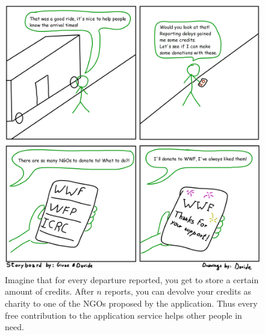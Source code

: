 \documentclass[a4paper, 11pt]{report}
\begin{document}
\begin{figure}[H]
	\centering
	\includegraphics [width=.5\textwidth]{img/storyboards/storyboard_donations.png}%
	\caption{Imagine that for every departure reported, you get to store a certain amount of credits.
		After $n$ reports, you can devolve your credits as charity to one of the NGOs proposed by the application. Thus every free contribution to the application service
		helps other people in need.}
	\label{fig:d}
\end{figure}
\end{document}
